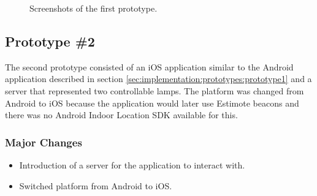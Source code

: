 \begin{figure}%
    \centering
    \caption{Screenshots of the first prototype.}
    \label{fig:prototype1-app-screenshots}
\end{figure}


\subsection{Prototype \#2}
\label{sec:implementation:prototypes:prototype2}

The second prototype consisted of an iOS application similar to the Android application described in section \ref{sec:implementation:prototypes:prototype1} and a server that represented two controllable lamps.
The platform was changed from Android to iOS because the application would later use Estimote beacons and there was no Android Indoor Location SDK available for this. 

\subsubsection*{Major Changes}
\begin{itemize}
\item Introduction of a server for the application to interact with.
\item Switched platform from Android to iOS.
\end{itemize}

